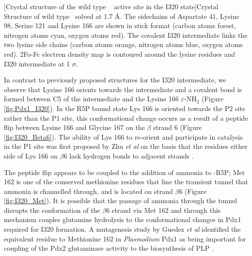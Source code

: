 \begin{minipage}{\linewidth}
	[Crystal structure of the wild type \atpdx~ active site in the I320 state]{Crystal Structure of wild type \atpdx ~solved at 1.7 \si{\angstrom}. The sidechains of Aspartate 41, Lysine 98, Serine 121 and Lysine 166 are shown in stick format (carbon atoms forest, nitrogen atoms cyan, oxygen atoms red). The covalent I320 intermediate links the two lysine side chains (carbon atoms orange, nitrogen atoms blue, oxygen atoms red). 2Fo-Fc electron density map is contoured around the lysine residues and I320 intermediate at 1 $\sigma$.\label{fig:Pdx1_I320}}
\end{minipage}

In contrast to previously proposed structures for the I320 intermediate, we observe that Lysine 166 orients towards the intermediate and a covalent bond is formed between C5 of the intermediate and the Lysine 166 $\varepsilon$-NH$_2$ (Figure \ref{fig:Pdx1_I320}). In the R5P bound state Lys 166 is oriented towards the P2 site rather than the P1 site, this conformational change occurs as a result of a peptide flip between Lysine 166 and Glycine 167 on the $\beta$ strand 6 (Figure \ref{fig:I320_Beta6}). The ability of Lys 166 to re-orient and participate in catalysis in the P1 site was first proposed by Zhu \textit{et al} on the basis that the residues either side of Lys 166 on $\beta$6 lack hydrogen bonds to adjacent strands \cite{Zhu2005}. 

The peptide flip appears to be coupled to the addition of ammonia to \atpdx -R5P; Met 162 is one of the conserved methionine residues that line the transient tunnel that ammonia is channelled through, and is located on strand $\beta$6 (Figure \ref{fig:I320_Met}). It is possible that the passage of ammonia through the tunnel disrupts the conformation of the $\beta$6 strand via Met 162 and through this mechanism couples glutamine hydrolysis to the conformational changes in Pdx1 required for I320 formation. A mutagenesis study by Guedez \textit{et al} identified the equivalent residue to Methionine 162 in \textit{Plasmodium} Pdx1 as being important for coupling of the Pdx2 glutaminase activity to the biosynthesis of PLP \cite{Guedez2012}. 

